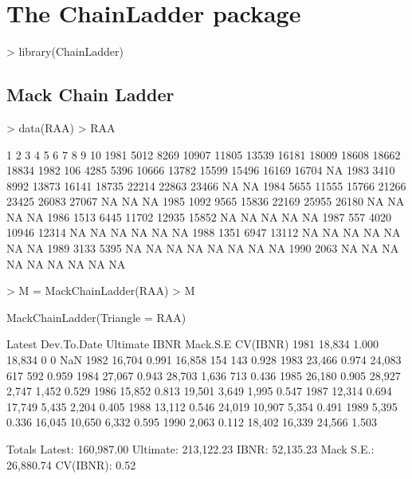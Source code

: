 \documentclass[a4paper]{article}
\newcommand{\pkg}[1]{\textbf{#1}}
\begin{document}
\section{The \pkg{ChainLadder} package}
\begin{Schunk}
\begin{Sinput}
> library(ChainLadder)
\end{Sinput}
\end{Schunk}

\subsection{Mack Chain Ladder}
\begin{Schunk}
\begin{Sinput}
> data(RAA)
> RAA
\end{Sinput}
\begin{Soutput}
        1     2     3     4     5     6     7     8     9    10
1981 5012  8269 10907 11805 13539 16181 18009 18608 18662 18834
1982  106  4285  5396 10666 13782 15599 15496 16169 16704    NA
1983 3410  8992 13873 16141 18735 22214 22863 23466    NA    NA
1984 5655 11555 15766 21266 23425 26083 27067    NA    NA    NA
1985 1092  9565 15836 22169 25955 26180    NA    NA    NA    NA
1986 1513  6445 11702 12935 15852    NA    NA    NA    NA    NA
1987  557  4020 10946 12314    NA    NA    NA    NA    NA    NA
1988 1351  6947 13112    NA    NA    NA    NA    NA    NA    NA
1989 3133  5395    NA    NA    NA    NA    NA    NA    NA    NA
1990 2063    NA    NA    NA    NA    NA    NA    NA    NA    NA
\end{Soutput}
\begin{Sinput}
> M = MackChainLadder(RAA)
> M
\end{Sinput}
\begin{Soutput}
MackChainLadder(Triangle = RAA)

     Latest Dev.To.Date Ultimate   IBNR Mack.S.E CV(IBNR)
1981 18,834       1.000   18,834      0        0      NaN
1982 16,704       0.991   16,858    154      143    0.928
1983 23,466       0.974   24,083    617      592    0.959
1984 27,067       0.943   28,703  1,636      713    0.436
1985 26,180       0.905   28,927  2,747    1,452    0.529
1986 15,852       0.813   19,501  3,649    1,995    0.547
1987 12,314       0.694   17,749  5,435    2,204    0.405
1988 13,112       0.546   24,019 10,907    5,354    0.491
1989  5,395       0.336   16,045 10,650    6,332    0.595
1990  2,063       0.112   18,402 16,339   24,566    1.503

               Totals
Latest:    160,987.00
Ultimate:  213,122.23
IBNR:       52,135.23
Mack S.E.:  26,880.74
CV(IBNR):        0.52
\end{Soutput}
\end{Schunk}






\end{document}
